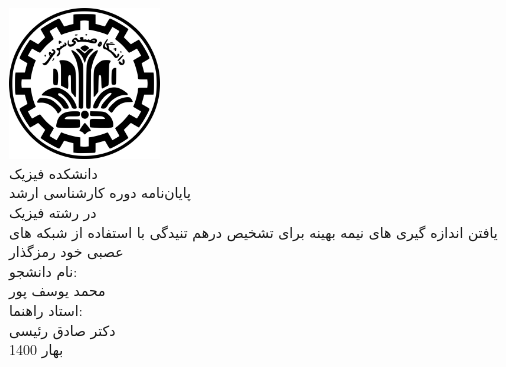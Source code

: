 \pagestyle{empty}
\begin{center}
\includegraphics[width=0.3\textwidth]{logo.png}\\
\Nastaliq
\large{دانشکده فیزیک}\\\vspace{1cm}
\titlefont
\large{ پایان‌نامه دوره کارشناسی ارشد}\\
\large{در رشته فیزیک}\\
\vspace{1cm}
\Large{یافتن اندازه گیری های نیمه بهینه برای تشخیص درهم تنیدگی با استفاده از شبکه های عصبی خود رمزگذار}\\\vspace{2cm}
\normalsize{نام دانشجو:}\\
\large{محمد یوسف پور}\\\vspace{2cm}
\normalsize{استاد راهنما:}\\
\large{دکتر صادق رئیسی}\\\vspace{2cm}
\normalsize{بهار 1400}

\end{center}
\newpage\null\newpage
